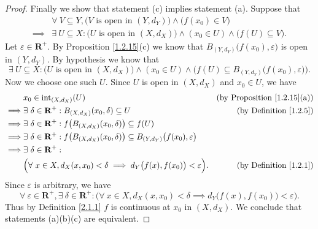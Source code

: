 \begin{proof}
    Finally we show that statement (c) implies statement (a).
    Suppose that
    \begin{align*}
                 & \forall\ V \subseteq Y, \big(V \text{ is open in } (Y, d_Y)\big) \land \big(f(x_0) \in V\big)                         \\
        \implies & \exists\ U \subseteq X : \big(U \text{ is open in } (X, d_X)\big) \land (x_0 \in U) \land \big(f(U) \subseteq V\big).
    \end{align*}
    Let \(\varepsilon \in \mathbf{R}^+\).
    By Proposition \ref{1.2.15}(c) we know that \(B_{(Y, d_Y)}\big(f(x_0), \varepsilon\big)\) is open in \((Y, d_Y)\).
    By hypothesis we know that
    \[
        \exists\ U \subseteq X : \big(U \text{ is open in } (X, d_X)\big) \land (x_0 \in U) \land \Big(f(U) \subseteq B_{(Y, d_Y)}\big(f(x_0), \varepsilon\big)\Big).
    \]
    Now we choose one such \(U\).
    Since \(U\) is open in \((X, d_X)\) and \(x_0 \in U\), we have
    \begin{align*}
                 & x_0 \in \text{int}_{(X, d_X)}(U)                                                                                            & \text{(by Proposition \ref{1.2.15}(a))} \\
        \implies & \exists\ \delta \in \mathbf{R}^+ : B_{(X, d_X)}(x_0, \delta) \subseteq U                                                    & \text{(by Definition \ref{1.2.5})}      \\
        \implies & \exists\ \delta \in \mathbf{R}^+ : f\big(B_{(X, d_X)}(x_0, \delta)\big) \subseteq f(U)                                                                                \\
        \implies & \exists\ \delta \in \mathbf{R}^+ : f\big(B_{(X, d_X)}(x_0, \delta)\big) \subseteq B_{(Y, d_Y)}\big(f(x_0), \varepsilon\big)                                           \\
        \implies & \exists\ \delta \in \mathbf{R}^+ :                                                                                                                                    \\
                 & \Big(\forall\ x \in X, d_X(x, x_0) < \delta \implies d_Y\big(f(x), f(x_0)\big) < \varepsilon\Big).                          & \text{(by Definition \ref{1.2.1})}
    \end{align*}
    Since \(\varepsilon\) is arbitrary, we have
    \[
        \forall\ \varepsilon \in \mathbf{R}^+, \exists\ \delta \in \mathbf{R}^+ : \Big(\forall\ x \in X, d_X(x, x_0) < \delta \implies d_Y\big(f(x), f(x_0)\big) < \varepsilon\Big).
    \]
    Thus by Definition \ref{2.1.1} \(f\) is continuous at \(x_0\) in \((X, d_X)\).
    We conclude that statements (a)(b)(c) are equivalent.
\end{proof}

